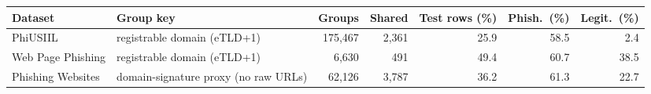 \begin{tabular}{@{}llrrrrr@{}}
\toprule
\textbf{Dataset} & \textbf{Group key} & \textbf{Groups} & \textbf{Shared} & \textbf{Test rows (\%)} & \textbf{Phish.\ (\%)} & \textbf{Legit.\ (\%)}\\
\midrule
PhiUSIIL & registrable domain (eTLD+1) & 175,467 & 2,361 & 25.9 & 58.5 & 2.4\\
Web Page Phishing & registrable domain (eTLD+1) & 6,630 & 491 & 49.4 & 60.7 & 38.5\\
Phishing Websites & domain-signature proxy (no raw URLs) & 62,126 & 3,787 & 36.2 & 61.3 & 22.7\\
\bottomrule
\end{tabular}